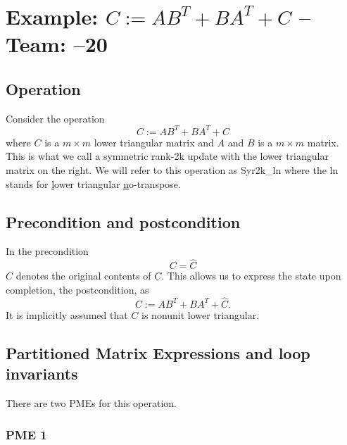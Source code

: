 \chapter{Example: $ C := A B ^ T + B A ^ T + C $ --  \large Team: --20}



\section{Operation}

Consider the operation
\[
C := A B ^ T + B A ^ T + C
\]
where $ C $ is a $ m \times m $ lower triangular matrix and $ A $ and $ B $ is a $ m \times m $ matrix.
This is what we call a symmetric rank-2k update
with the {\sc l}ower triangular matrix on the {\sc r}ight.
We will refer to this operation
as {\sc Syr2k\_ln} where the {\sc ln} stands for
\underline{l}ower triangular
\underline{n}o-transpose.

\section{Precondition and postcondition}

In the precondition 
\[
C = \widehat C
\]
$ \widehat C $ denotes the original contents of $ C $.
This allows us to express the state upon completion, the postcondition, as
\[
C := A B ^ T + B A ^ T + \widehat C.
\]
It is implicitly assumed that $ C $ is nonunit lower triangular.
\section{Partitioned Matrix Expressions and loop invariants}

There are two PMEs for this operation.

\subsection{PME 1}

